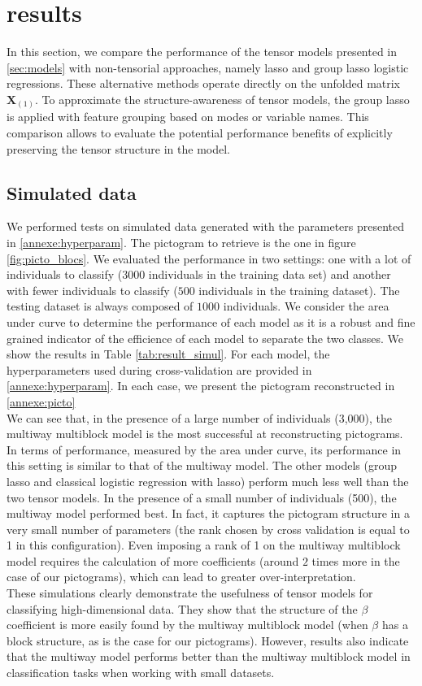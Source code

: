 \documentclass[preprint,12pt]{elsarticle}
\begin{document}
\newpage
\section{results}
\label{sec:results}
\noindent In this section, we compare the performance of the tensor models presented in \ref{sec:models} with non-tensorial approaches, namely lasso and group lasso logistic regressions. These alternative methods operate directly on the unfolded matrix $\mathbf{X}_{(1)}$. To approximate the structure-awareness of tensor models, the group lasso is applied with feature grouping based on modes or variable names. This comparison allows to evaluate the potential performance benefits of explicitly preserving the tensor structure in the model.
\subsection{Simulated data}
\noindent We performed tests on simulated data generated with the parameters presented in \ref{annexe:hyperparam}. The pictogram to retrieve is the one in figure \ref{fig:picto_blocs}. We evaluated the performance in two settings: one with a lot of individuals to classify ($3000$ individuals in the training data set) and another with fewer individuals to classify ($500$ individuals in the training dataset). The testing dataset is always composed of $1000$ individuals. We consider the area under curve to determine the performance of each model as it is a robust and fine grained indicator of the efficience of each model to separate the two classes. We show the results in Table \ref{tab:result_simul}. For each model, the hyperparameters used during cross-validation are provided in \ref{annexe:hyperparam}. In each case, we present the pictogram reconstructed in \ref{annexe:picto}\\
\indent We can see that, in the presence of a large number of individuals (3,000), the multiway multiblock model is the most successful at reconstructing pictograms. In terms of performance, measured by the area under curve, its performance in this setting is similar to that of the multiway model. The other models (group lasso and classical logistic regression with lasso) perform much less well than the two tensor models.
In the presence of a small number of individuals (500), the multiway model performed best. In fact, it captures the pictogram structure in a very small number of parameters (the rank chosen by cross validation is equal to 1 in this configuration). Even imposing a rank of 1 on the multiway multiblock model requires the calculation of more coefficients (around $2$ times more in the case of our pictograms), which can lead to greater over-interpretation.\\
\indent These simulations clearly demonstrate the usefulness of tensor models for classifying high-dimensional data. They show that the structure of the $\beta$ coefficient is more easily found by the multiway multiblock model (when $\beta$ has a block structure, as is the case for our pictograms). However, results also indicate that the multiway model performs better than the multiway multiblock model in classification tasks when working with small datasets.\\
\end{document}
